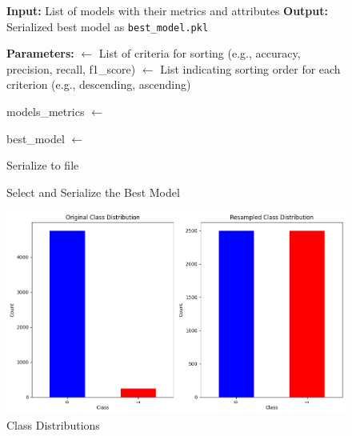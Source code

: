 \documentclass[runningheads]{llncs}
\begin{document}
\begin{figure}[!t]
    \centering
    \begin{minipage}{\textwidth}
        \begin{algorithm}[H]
            \caption{Select and Serialize the Best Model}
            \label{model_select_algo}
            \begin{algorithmic}[1]
                \State \textbf{Input:} List of models with their metrics and attributes
                \State \textbf{Output:} Serialized best model as \texttt{best\_model.pkl}
                
                \State \textbf{Parameters:} 
                \State {} $\gets$ List of criteria for sorting (e.g., accuracy, precision, recall, f1\_score)
                \State {} $\gets$ List indicating sorting order for each criterion (e.g., descending, ascending)
                
                \State models\_metrics $\gets$ 
                
                    \State {} 
                \EndFor
                
                \State best\_model $\gets$  
                
                \State Serialize  to file 
            \end{algorithmic}
        \end{algorithm}
    \end{minipage}
\end{figure}

\begin{figure}[H]
\centerline{\includegraphics[width=0.95\linewidth]{images/resamp.png}}
\caption{Class Distributions}
\label{fig:resamp}
\end{figure}
\end{document}
